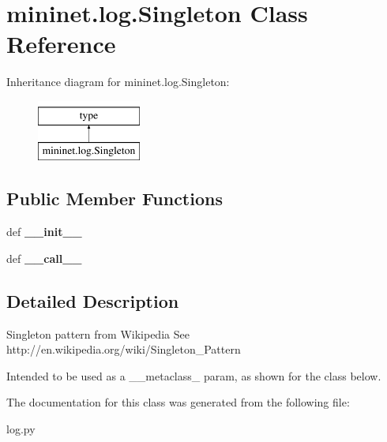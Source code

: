 \hypertarget{classmininet_1_1log_1_1Singleton}{\section{mininet.\-log.\-Singleton Class Reference}
\label{classmininet_1_1log_1_1Singleton}
}
Inheritance diagram for mininet.\-log.\-Singleton\-:\begin{figure}[H]
\begin{center}
\leavevmode
\includegraphics[height=2.000000cm]{classmininet_1_1log_1_1Singleton}
\end{center}
\end{figure}
\subsection*{Public Member Functions}
\begin{DoxyCompactItemize}
\item 
\hypertarget{classmininet_1_1log_1_1Singleton_a1a68c868c4b2465d47208f399e765fbe}{def {\bfseries \-\_\-\-\_\-init\-\_\-\-\_\-}}\label{classmininet_1_1log_1_1Singleton_a1a68c868c4b2465d47208f399e765fbe}

\item 
\hypertarget{classmininet_1_1log_1_1Singleton_a418a365d5ff47e3ff0362350716b461f}{def {\bfseries \-\_\-\-\_\-call\-\_\-\-\_\-}}\label{classmininet_1_1log_1_1Singleton_a418a365d5ff47e3ff0362350716b461f}

\end{DoxyCompactItemize}


\subsection{Detailed Description}
\begin{DoxyVerb}Singleton pattern from Wikipedia
   See http://en.wikipedia.org/wiki/Singleton_Pattern

   Intended to be used as a __metaclass_ param, as shown for the class
   below.\end{DoxyVerb}
 

The documentation for this class was generated from the following file\-:\begin{DoxyCompactItemize}
\item 
log.\-py\end{DoxyCompactItemize}
